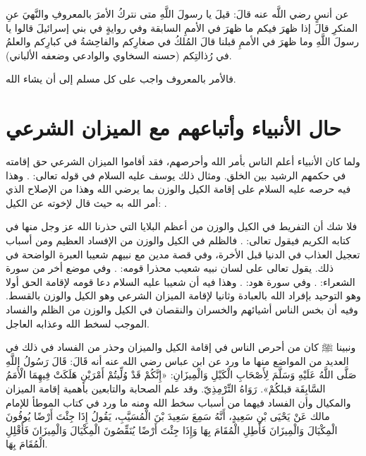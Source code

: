عن أنسٍ رضي اللَّه عنه قالَ: قيلَ يا رسولَ اللَّهِ متى نتركُ الأمرَ بالمعروفِ والنَّهيَ عنِ المنكرِ قالَ إذا ظهرَ فيكم ما ظهرَ في الأممِ السابقة وفي روايةٍ في بني إسرائيلَ قالوا يا رسولَ اللَّهِ وما ظهرَ في الأممِ قبلنا قالَ المُلكُ في صغارِكم والفاحِشةُ في كبارِكم والعلمُ في رُذالتِكم {\footnotesize (حسنه السخاوي والوادعي وضعفه الألباني)}.


فالأمر بالمعروف واجب على كل مسلم إلى أن يشاء الله. 



\section{حال الأنبياء وأتباعهم مع الميزان الشرعي}

ولما كان الأنبياء أعلم الناس بأمر الله وأحرصهم، فقد أقاموا الميزان الشرعي حق إقامته في حكمهم الرشيد بين الخلق. ومثال ذلك يوسف عليه السلام في قوله تعالى:
\quranayah*[12][55]{\footnotesize \surahname*[12]}.
وهذا فيه حرصه عليه السلام على إقامة الكيل والوزن بما يرضي الله وهذا من الإصلاح الذي أمر الله به حيث قال لإخوته عن الكيل:
\quranayah*[12][59-60]{\footnotesize \surahname*[12]}.

فلا شك أن التفريط في الكيل والوزن من أعظم البلايا التي حذرنا الله عز وجل منها في كتابه الكريم فيقول تعالى:
\quranayah*[83][1-6]{\footnotesize \surahname*[83]}. فالظلم في الكيل والوزن من الإفساد العظيم ومن أسباب تعجيل العذاب في الدنيا قبل الأخرة، وفي قصة مدين مع نبيهم شعيبا العبرة الواضحة في ذلك. يقول تعالى على لسان نبيه شعيب محذرا قومه:
\quranayah*[7][85]{\footnotesize \surahname*[7]}.
وفي موضع أخر من سورة الشعراء:
\quranayah*[26][181-183]{\footnotesize \surahname*[26]}.
وفي سورة هود:
\quranayah*[11][84-85]{\footnotesize \surahname*[11]}. وهذا فيه أن شعيبا عليه السلام دعا قومه لإقامة الحق أولا وهو التوحيد بإفراد الله بالعبادة وثانيا لإقامة الميزان الشرعي وهو الكيل والوزن بالقسط. وفيه أن بخس الناس أشيائهم والخسران والنقصان في الكيل والوزن من الظلم والفساد الموجب لسخط الله وعذابه العاجل.

ونبينا ﷺ كان من أحرص الناس في إقامة الكيل والميزان وحذر من الفساد في ذلك في العديد من المواضع منها ما ورد عن ابن عباس رضي الله عنه أنه قَالَ: قَالَ رَسُولُ اللَّهِ صَلَّى اللَّهُ عَلَيْهِ وَسَلَّمَ لِأَصْحَابِ الْكَيْلِ وَالْمِيزَانِ: «إِنَّكُمْ قَدْ وُلِّيتُمْ أَمْرَيْنِ هَلَكَتْ فِيهِمَا الْأُمَمُ السَّابِقَة قبلكُمْ».
{\footnotesize رَوَاهُ التِّرْمِذِيّ}. وقد علم الصحابة والتابعين بأهمية إقامة الميزان والمكيال وأن الفساد فيهما من أسباب سخط الله ومنه ما ورد في كتاب الموطأ للإمام مالك عَنْ يَحْيَى بْنِ سَعِيدٍ، أَنَّهُ سَمِعَ سَعِيدَ بْنَ الْمُسَيَّبِ، يَقُولُ إِذَا جِئْتَ أَرْضًا يُوفُونَ الْمِكْيَالَ وَالْمِيزَانَ فَأَطِلِ الْمُقَامَ بِهَا وَإِذَا جِئْتَ أَرْضًا يُنَقِّصُونَ الْمِكْيَالَ وَالْمِيزَانَ فَأَقْلِلِ الْمُقَامَ بِهَا.

